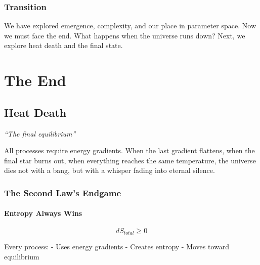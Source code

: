 \documentclass[
  11pt,
  letterpaper,
  twoside,
  openright]{book}
\begin{document}
\section{Transition}\label{transition-42}

We have explored emergence, complexity, and our place in parameter
space. Now we must face the end. What happens when the universe runs
down? Next, we explore heat death and the final state.

\part{The End}

\chapter{Heat Death}\label{sec-heat-death}

\emph{``The final equilibrium''}

\begin{tcolorbox}[enhanced jigsaw, leftrule=.75mm, title=\textcolor{quarto-callout-note-color}{\faInfo}\hspace{0.5em}{Key Revelation}, bottomrule=.15mm, opacityback=0, coltitle=black, arc=.35mm, colframe=quarto-callout-note-color-frame, colbacktitle=quarto-callout-note-color!10!white, colback=white, titlerule=0mm, breakable, bottomtitle=1mm, toptitle=1mm, rightrule=.15mm, toprule=.15mm, left=2mm, opacitybacktitle=0.6]

All processes require energy gradients. When the last gradient flattens,
when the final star burns out, when everything reaches the same
temperature, the universe dies not with a bang, but with a whisper
fading into eternal silence.

\end{tcolorbox}

\section{The Second Law's Endgame}\label{the-second-laws-endgame}

\subsection{Entropy Always Wins}\label{entropy-always-wins}

\[
dS_{total} \geq 0
\]

Every process: - Uses energy gradients - Creates entropy - Moves toward
equilibrium
\end{document}
